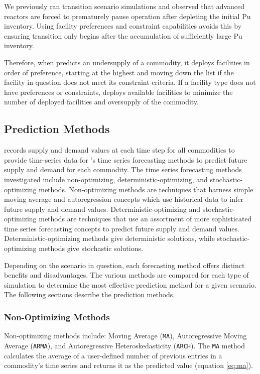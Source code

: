 We previously ran transition scenario simulations and observed that 
advanced reactors are forced to prematurely pause operation 
after depleting the initial Pu inventory. 
Using facility preferences and constraint capabilities avoids this 
by ensuring transition only begins after the accumulation of 
sufficiently large Pu inventory.

Therefore, when \deploy predicts an undersupply of a commodity, 
it deploys facilities in order of preference, starting at 
the highest and moving down the list if the facility in question does 
not meet its constraint criteria.
If a facility type does not have preferences or constraints, \deploy 
deploys available facilities to minimize the number of deployed 
facilities and oversupply of the commodity.

\subsection{Prediction Methods}
\deploy records supply and demand values at each time step for all 
commodities to provide time-series data for \deploy's time series 
forecasting methods to predict future supply and demand for each 
commodity.  
The time series forecasting methods investigated include non-optimizing, 
deterministic-optimizing, and stochastic-optimizing methods. 
Non-optimizing methods are techniques that harness 
simple moving average and autoregression concepts which use 
historical data to infer future supply and demand values. 
Deterministic-optimizing and stochastic-optimizing 
methods are techniques 
that use an assortment of more sophisticated time series forecasting 
concepts to predict future supply and demand values. 
Deterministic-optimizing methods give deterministic solutions,
while stochastic-optimizing methods give stochastic solutions. 

Depending on the scenario in question, each forecasting method 
offers distinct benefits and disadvantages.
The various methods are compared for each type of simulation 
to determine the most effective prediction method for 
a given scenario. 
The following sections describe the prediction methods. 

\subsubsection{Non-Optimizing Methods}
Non-optimizing methods include: Moving Average (\texttt{MA}), 
Autoregressive Moving Average (\texttt{ARMA}), and 
Autoregressive Heteroskedasticity (\texttt{ARCH}). 
The \texttt{MA} method calculates the average of 
a user-defined number of previous entries in a commodity's 
time series and returns it as the predicted value 
(equation \ref{eq:ma}).

